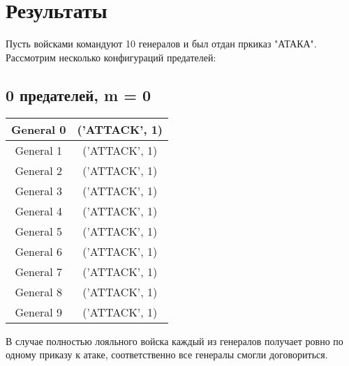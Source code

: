 \documentclass[12pt,a4paper]{article}
\begin{document}
            
	\newpage
	
	\section{Результаты}  
            Пусть войсками командуют 10 генералов и был отдан пркиказ "АТАКА". Рассмотрим несколько конфигураций предателей:
            \subsection{0 предателей, m = 0}
                \begin{center}
                    \begin{tabular}{|c|c|}
                        \hline
                        General 0 & ('ATTACK', 1) \\ \hline
                        General 1 & ('ATTACK', 1) \\ \hline
                        General 2 & ('ATTACK', 1) \\ \hline
                        General 3 & ('ATTACK', 1) \\ \hline
                        General 4 & ('ATTACK', 1) \\ \hline
                        General 5 & ('ATTACK', 1) \\ \hline
                        General 6 & ('ATTACK', 1) \\ \hline
                        General 7 & ('ATTACK', 1) \\ \hline
                        General 8 & ('ATTACK', 1) \\ \hline
                        General 9 & ('ATTACK', 1) \\ \hline
                    \end{tabular}
                \end{center}
                В случае полностью лояльного войска каждый из генералов получает ровно по одному приказу к атаке, соответственно все генералы смогли договориться.
                
\end{document}
